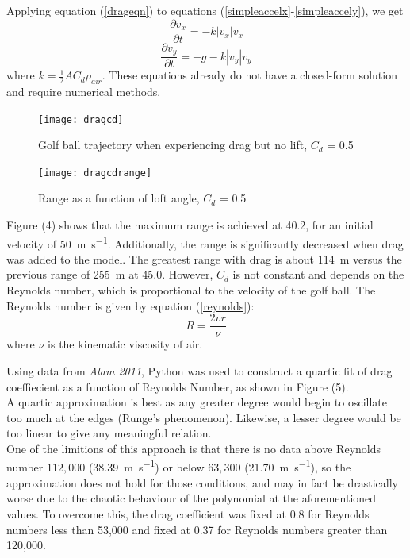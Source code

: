 \documentclass[12pt]{article}
\begin{document}
Applying equation (\ref{drageqn}) to equations (\ref{simpleaccelx}-\ref{simpleaccely}), we get
\begin{equation} \label{dragaccelx}
\frac{\partial v_x}{\partial t}=-k |v_x| v_x
\end{equation}
\begin{equation} \label{dragaccely}
\frac{\partial v_y}{\partial t}=-g-k |v_y| v_y
\end{equation}
where $k=\frac{1}{2} A C_d \rho_{air}$. These equations already do not have a closed-form solution and require numerical methods.
\begin{figure}[H]
\centering
\caption{Golf ball trajectory when experiencing drag but no lift, $C_d$ = 0.5}
\texttt{[image: dragcd]}
\end{figure}

\begin{figure}[H]
\centering
\caption{Range as a function of loft angle, $C_d$ = 0.5}
\texttt{[image: dragcdrange]}
\end{figure}

Figure (4) shows that the maximum range is achieved at 40.2\degree, for an initial velocity of \SI{50}{\metre\per\second}. Additionally, the range is significantly decreased when drag was added to the model. The greatest range with drag is about \SI{114}{\metre} versus the previous range of \SI{255}{\metre} at 45.0\degree.
However, $C_d$ is not constant and depends on the Reynolds number, which is proportional to the velocity of the golf ball. The Reynolds number is given by equation (\ref{reynolds})\cite{Alam2011}:
\begin{equation} \label{reynolds}
R=\frac{2vr}{\nu}
\end{equation}
where $\nu$ is the kinematic viscosity of air.

Using data from \textit{Alam 2011}\cite{Alam2011}, Python was used to construct a quartic fit of drag coeffiecient as a function of Reynolds Number, as shown in Figure (5).\\
A quartic approximation is best as any greater degree would begin to oscillate too much at the edges (Runge's phenomenon). Likewise, a lesser degree would be too linear to give any meaningful relation.\\
One of the limitions of this approach is that there is no data above Reynolds number $112,000$ (\SI{38.39}{\meter\per\second}) or below $63,300$ (\SI{21.70}{\meter\per\second}), so the approximation does not hold for those conditions, and may in fact be drastically worse due to the chaotic behaviour of the polynomial at the aforementioned values. To overcome this, the drag coefficient was fixed at 0.8 for Reynolds numbers less than 53,000 and fixed at 0.37 for Reynolds numbers greater than 120,000.
\end{document}
